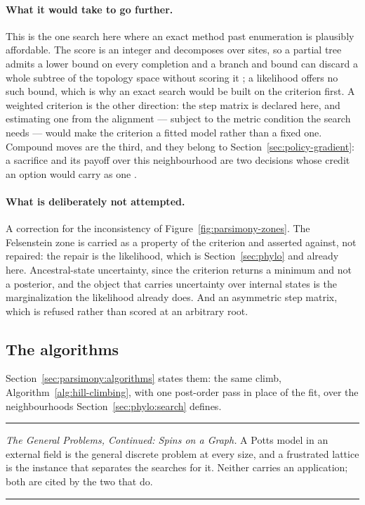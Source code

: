 \documentclass[11pt,a4paper]{article}
\begin{document}
\paragraph{What it would take to go further.}
This is the one search here where an exact method past enumeration is plausibly
affordable. The score is an integer and decomposes over sites, so a partial
tree admits a lower bound on every completion and a branch and bound can
discard a whole subtree of the topology space without scoring it
\citep{papadimitriou1998, clrs2022}; a likelihood offers no such bound, which
is why an exact search would be built on the criterion first. A weighted
criterion is the other direction: the step matrix is declared here, and
estimating one from the alignment --- subject to the metric condition the
search needs --- would make the criterion a fitted model rather
than a fixed one. Compound moves are the third, and they belong to
Section~\ref{sec:policy-gradient}: a sacrifice and its payoff over this
neighbourhood are two decisions whose credit an option would carry as one
\citep{sutton1999}.

\paragraph{What is deliberately not attempted.}
A correction for the inconsistency of Figure~\ref{fig:parsimony-zones}. The
Felsenstein zone is carried as a property of the criterion and asserted
against, not repaired: the repair is the likelihood, which is
Section~\ref{sec:phylo} and already here. Ancestral-state uncertainty, since
the criterion returns a minimum and not a posterior, and the object that
carries uncertainty over internal states is the marginalization the
likelihood already does. And an asymmetric step matrix, which is refused
rather than scored at an arbitrary root.

\subsection{The algorithms}
Section~\ref{sec:parsimony:algorithms} states them: the same
climb, Algorithm~\ref{alg:hill-climbing}, with one post-order pass in place of
the fit, over the neighbourhoods Section~\ref{sec:phylo:search} defines.

\begin{center}\rule{0.45\linewidth}{0.4pt}\end{center}
\noindent\textit{The General Problems, Continued: Spins on a Graph.} A Potts model in an
external field is the general discrete problem at every size, and a frustrated
lattice is the instance that separates the searches for it. Neither carries an
application; both are cited by the two that do.
\begin{center}\rule{0.45\linewidth}{0.4pt}\end{center}
\end{document}
